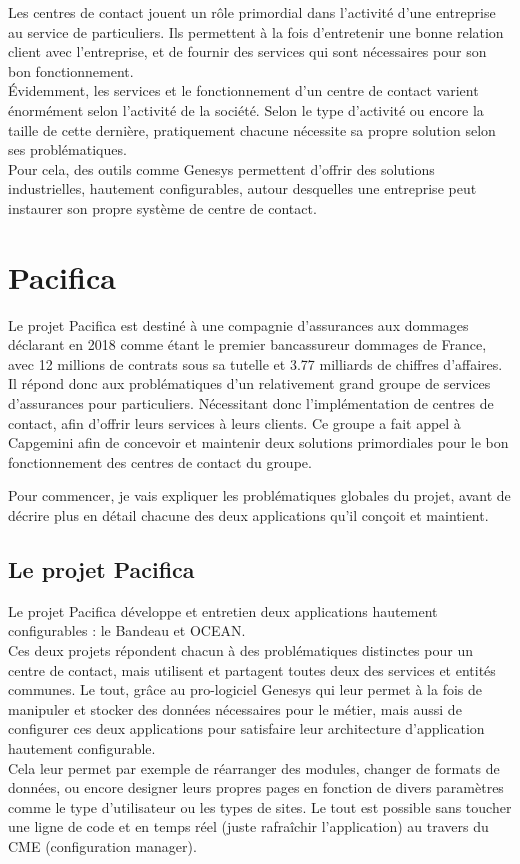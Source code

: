 \documentclass{rapport}
\begin{document}
Les centres de contact jouent un rôle primordial dans l'activité d'une entreprise au service de particuliers. Ils permettent à la fois d'entretenir une bonne relation client avec l'entreprise, et de fournir des services qui sont nécessaires pour son bon fonctionnement.\\
Évidemment, les services et le fonctionnement d'un centre de contact varient énormément selon l'activité de la société. Selon le type d'activité ou encore la taille de cette dernière, pratiquement chacune nécessite sa propre solution selon ses problématiques.\\
Pour cela, des outils comme Genesys permettent d'offrir des solutions industrielles, hautement configurables, autour desquelles une entreprise peut instaurer son propre système de centre de contact.

\newpage

\section{Pacifica}

Le projet Pacifica est destiné à une compagnie d'assurances aux dommages déclarant en 2018 comme étant le premier bancassureur dommages de France, avec 12 millions de contrats sous sa tutelle et 3.77 milliards de chiffres d'affaires.\\

Il répond donc aux problématiques d'un relativement grand groupe de services d'assurances pour particuliers. Nécessitant donc l'implémentation de centres de contact, afin d'offrir leurs services à leurs clients. Ce groupe a fait appel à Capgemini afin de concevoir et maintenir deux solutions primordiales pour le bon fonctionnement des centres de contact du groupe.

Pour commencer, je vais expliquer les problématiques globales du projet, avant de décrire plus en détail chacune des deux applications qu'il conçoit et maintient.


\subsection{Le projet Pacifica}

Le projet Pacifica développe et entretien deux applications hautement configurables : le Bandeau et OCEAN.\\
Ces deux projets répondent chacun à des problématiques distinctes pour un centre de contact, mais utilisent et partagent toutes deux des services et entités communes. Le tout, grâce au pro-logiciel Genesys qui leur permet à la fois de manipuler et stocker des données nécessaires pour le métier, mais aussi de configurer ces deux applications pour satisfaire leur architecture d'application hautement configurable.\\
Cela leur permet par exemple de réarranger des modules, changer de formats de données, ou encore designer leurs propres pages en fonction de divers paramètres comme le type d'utilisateur ou les types de sites. Le tout est possible sans toucher une ligne de code et en temps réel (juste rafraîchir l'application) au travers du CME (configuration manager).
\end{document}
